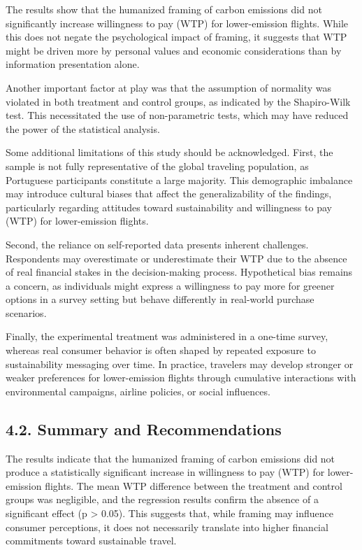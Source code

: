 \documentclass[
]{article}
\begin{document}
The results show that the humanized framing of carbon emissions did not
significantly increase willingness to pay (WTP) for lower-emission
flights. While this does not negate the psychological impact of framing,
it suggests that WTP might be driven more by personal values and
economic considerations than by information presentation alone.

Another important factor at play was that the assumption of normality
was violated in both treatment and control groups, as indicated by the
Shapiro-Wilk test. This necessitated the use of non-parametric tests,
which may have reduced the power of the statistical analysis.

Some additional limitations of this study should be acknowledged. First,
the sample is not fully representative of the global traveling
population, as Portuguese participants constitute a large majority. This
demographic imbalance may introduce cultural biases that affect the
generalizability of the findings, particularly regarding attitudes
toward sustainability and willingness to pay (WTP) for lower-emission
flights.

Second, the reliance on self-reported data presents inherent challenges.
Respondents may overestimate or underestimate their WTP due to the
absence of real financial stakes in the decision-making process.
Hypothetical bias remains a concern, as individuals might express a
willingness to pay more for greener options in a survey setting but
behave differently in real-world purchase scenarios.

Finally, the experimental treatment was administered in a one-time
survey, whereas real consumer behavior is often shaped by repeated
exposure to sustainability messaging over time. In practice, travelers
may develop stronger or weaker preferences for lower-emission flights
through cumulative interactions with environmental campaigns, airline
policies, or social influences.

\hypertarget{summary-and-recommendations}{%
\subsection{4.2. Summary and
Recommendations}\label{summary-and-recommendations}}

The results indicate that the humanized framing of carbon emissions did
not produce a statistically significant increase in willingness to pay
(WTP) for lower-emission flights. The mean WTP difference between the
treatment and control groups was negligible, and the regression results
confirm the absence of a significant effect (p \textgreater{} 0.05).
This suggests that, while framing may influence consumer perceptions, it
does not necessarily translate into higher financial commitments toward
sustainable travel.
\end{document}
